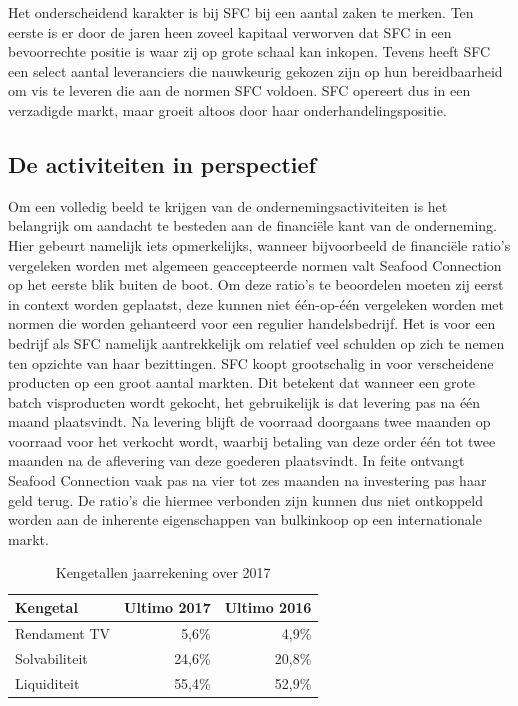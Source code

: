 \documentclass[10pt,a4paper,twoside]{report}
\begin{document}
Het onderscheidend karakter is bij SFC bij een aantal zaken te merken. Ten eerste is er door de jaren heen zoveel kapitaal verworven dat SFC in een bevoorrechte positie is waar zij op grote schaal kan inkopen. Tevens heeft SFC een select aantal leveranciers die nauwkeurig gekozen zijn op hun bereidbaarheid om vis te leveren die aan de normen SFC voldoen. SFC opereert dus in een verzadigde markt, maar groeit altoos door haar onderhandelingspositie.

\subsection{De activiteiten in perspectief} \label{beschr:activiteiten}
Om een volledig beeld te krijgen van de ondernemingsactiviteiten is het belangrijk om aandacht te besteden aan de financiële kant van de onderneming. Hier gebeurt namelijk iets opmerkelijks, wanneer bijvoorbeeld de financiële ratio's vergeleken worden met algemeen geaccepteerde normen valt Seafood Connection op het eerste blik buiten de boot. Om deze ratio’s te beoordelen moeten zij eerst in context worden geplaatst, deze kunnen niet één-op-één vergeleken worden met normen die worden gehanteerd voor een regulier handelsbedrijf. Het is voor een bedrijf als SFC namelijk aantrekkelijk om relatief veel schulden op zich te nemen ten opzichte van haar bezittingen. SFC koopt grootschalig in voor verscheidene producten op een groot aantal markten. Dit betekent dat wanneer een grote batch visproducten wordt gekocht, het gebruikelijk is dat levering pas na één maand plaatsvindt. Na levering blijft de voorraad doorgaans twee maanden op voorraad voor het verkocht wordt, waarbij betaling van deze order één tot twee maanden na de aflevering van deze goederen plaatsvindt. In feite ontvangt Seafood Connection vaak pas na vier tot zes maanden na investering pas haar geld terug. De ratio’s die hiermee verbonden zijn kunnen dus niet ontkoppeld worden aan de inherente eigenschappen van bulkinkoop op een internationale markt. \citep{jaarrapport2017}

\begin{table}[h]
    \centering
    \caption{Kengetallen jaarrekening over 2017 \citep{jaarrapport2017}}
    \begin{tabular}{l r r}
        \toprule
        \textbf{Kengetal} & \textbf{Ultimo 2017} & \textbf{Ultimo 2016} \\
        \midrule
        Rendament TV & 5,6\% & 4,9\% \\
        Solvabiliteit & 24,6\% & 20,8\% \\
        Liquiditeit & 55,4\% & 52,9\% \\
        \bottomrule
    \end{tabular}
    \label{tab:kengetallen}
\end{table}
\end{document}
